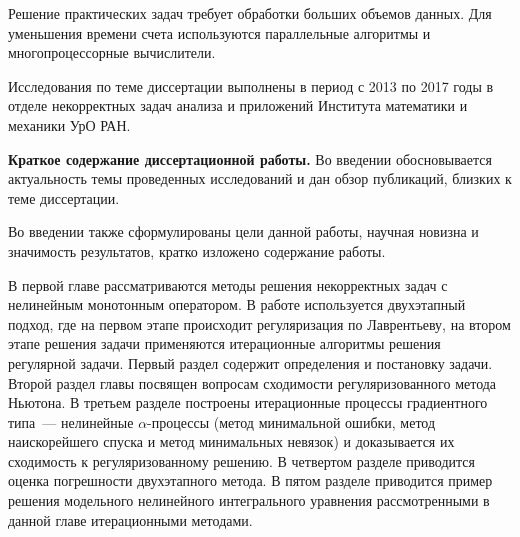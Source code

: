 \intro

%
%

\actualitysection
\actualitytext

Решение практических задач требует обработки больших объемов данных. Для уменьшения времени счета используются параллельные алгоритмы и многопроцессорные вычислители.


\developmentsection
\developmenttext

\objectivesection
\objectivetext

\methodssection
\methodstext

\noveltysection
\noveltytext

{}


\approbationsection
\approbationtext

\pubsection
\pubtext

\contribsection
\contribtext

\structsection
\structtext


Исследования по теме диссертации выполнены в период с 2013 по 2017 годы в отделе некорректных задач анализа и приложений Института математики и механики УрО РАН.

\textbf{Краткое содержание диссертационной работы.}
Во введении обосновывается актуальность темы проведенных исследований и дан обзор публикаций, близких к теме диссертации.

Во введении также сформулированы цели данной работы, научная новизна и значимость результатов, кратко изложено содержание работы.

В первой главе рассматриваются методы решения некорректных задач с нелинейным монотонным оператором. В работе используется двухэтапный подход, где на первом этапе происходит регуляризация по Лаврентьеву, на втором этапе решения задачи применяются итерационные алгоритмы решения регулярной задачи. Первый раздел содержит определения и постановку задачи. Второй раздел главы посвящен вопросам сходимости регуляризованного метода Ньютона. В третьем разделе построены итерационные процессы градиентного типа~--- нелинейные $\alpha$-процессы (метод минимальной ошибки, метод наискорейшего спуска и метод минимальных невязок) и доказывается их сходимость к регуляризованному решению. В четвертом разделе приводится оценка погрешности двухэтапного метода. В пятом разделе приводится пример решения модельного нелинейного интегрального уравнения рассмотренными в данной главе итерационными методами.

